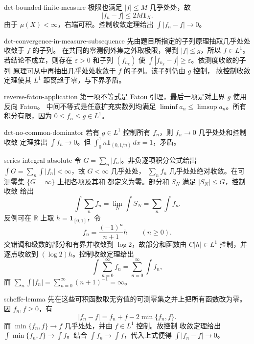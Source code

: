 \begin{solution}{dct-bounded-finite-measure}
极限也满足 \(|f|\le M\) 几乎处处，故
\[
 |f_n-f|\le2M\mathbf1_X.
\]
由于 \(\mu(X)<\infty\)，右端可积。控制收敛定理给出
\(\int|f_n-f|\to0\)。
\end{solution}

\begin{solution}{dct-convergence-in-measure-subsequence}
先由题目所指定的子列原理抽取几乎处处收敛于 \(f\) 的子列。
在共同的零测例外集之外取极限，得到 \(|f|\le g\)，所以 \(f\in L^1\)。
若结论不成立，则存在 \(\varepsilon>0\) 和子列
\((f_{n_k})\) 使 \(\int|f_{n_k}-f|\ge\varepsilon\)。依测度收敛的子列
原理可从中再抽出几乎处处收敛于 \(f\) 的子列。该子列仍由 \(g\) 控制，
故控制收敛定理使其 \(L^1\) 距离趋于零，与下界矛盾。
\end{solution}

\begin{solution}{reverse-fatou-application}
第一项不等式是 Fatou 引理，最后一项是对上界 \(g\) 使用反向 Fatou。
中间不等式是任意扩充实数列均满足
\(\liminf a_n\le\limsup a_n\)。所有积分有限，因为
\(0\le f_n\le g\in L^1\)。
\end{solution}

\begin{solution}{dct-no-common-dominator}
若有 \(g\in L^1\) 控制所有 \(f_n\)，则 \(f_n\to0\) 几乎处处和控制收敛
定理推出 \(\int f_n\to0\)。但
\(\int_0^1n\mathbf1_{(0,1/n)}\,dx=1\)，矛盾。
\end{solution}

\begin{solution}{series-integral-absolute}
令 \(G=\sum_n|f_n|\)。非负逐项积分公式给出
\(\int G=\sum_n\int|f_n|<\infty\)，故 \(G<\infty\) 几乎处处，
\(\sum_nf_n\) 几乎处处绝对收敛。在可测零集 \(\{G=\infty\}\) 上把各项及其和
都定义为零。部分和 \(S_N\) 满足 \(|S_N|\le G\)，控制收敛
给出
\[
 \int\sum_nf_n=\lim_N\int S_N=\sum_n\int f_n.
\]
反例可在 \(\mathbb R\) 上取 \(h=\mathbf1_{[0,1]}\)，令
\[
 f_n=\frac{(-1)^n}{n+1}h\qquad(n\ge0).
\]
交错调和级数的部分和有界并收敛到 \(\log2\)，故部分和函数由
\(C|h|\in L^1\) 控制，并逐点收敛到 \((\log2)h\)。控制收敛定理给出
\[
 \int\sum_{n=0}^{\infty}f_n
 =\sum_{n=0}^{\infty}\int f_n,
\]
而
\(\sum_n\int|f_n|=\sum_{n=0}^{\infty}(n+1)^{-1}=\infty\)。
\end{solution}

\begin{solution}{scheffe-lemma}
先在这些可积函数取无穷值的可测零集之并上把所有函数改为零。
因 \(f_n,f\ge0\)，有
\[
 |f_n-f|=f_n+f-2\min\{f_n,f\}.
\]
而 \(\min\{f_n,f\}\to f\) 几乎处处，并由 \(f\in L^1\) 控制。故控制
收敛定理给出
\(\int\min\{f_n,f\}\to\int f\)。结合
\(\int f_n\to\int f\)，代入上式便得
\(\int|f_n-f|\to0\)。
\end{solution}

